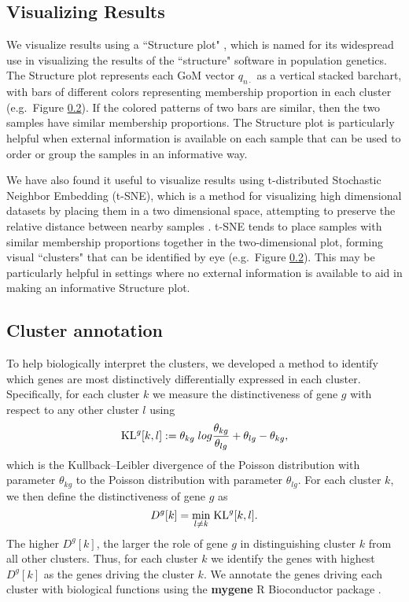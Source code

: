\subsection{Visualizing Results}

We visualize results using a ``Structure plot" \cite{Rosenberg2002}, 
which is named for its widespread use in visualizing the
results of the ``structure" software \cite{PritchardEtAl} in population genetics.
The Structure plot represents each GoM vector $q_{n\cdot}$
as  a vertical stacked barchart, with bars of different colors representing membership proportion in each cluster (e.g.~Figure \ref{}). If the colored patterns of two bars are similar, then the two samples have similar membership proportions.  The Structure plot is particularly helpful when external information is available on each sample that can be used to order or group the samples in an informative way.

We have also found it useful to visualize results using t-distributed Stochastic Neighbor Embedding (t-SNE), which is a method for visualizing high dimensional datasets by placing them in a two dimensional space, attempting to preserve the relative distance between nearby samples \cite{Maaten2014,Maaten2008}. t-SNE tends to place samples with similar membership proportions together in the two-dimensional plot, forming visual ``clusters" that can be identified by eye (e.g.~Figure \ref{}). This may be particularly helpful in settings where no external information is available to aid in making an informative Structure plot. 


\subsection{Cluster annotation}

To help biologically interpret the clusters, we developed a method to identify which genes are most distinctively differentially expressed in each cluster.  Specifically, for each cluster $k$ we measure the distinctiveness of gene $g$ with respect to any other cluster $l$ using
\begin{equation}
\text{KL}^{g} [k,l] : = \theta_{kg} \; log \frac{\theta_{kg}}{\theta_{lg}} + \theta_{lg} - \theta_{kg},
\end{equation}
which is the Kullback--Leibler divergence of the Poisson distribution with parameter $\theta_{kg}$ to the Poisson distribution with parameter $\theta_{lg}$. 
For each cluster $k$, we then define the distinctiveness of gene $g$ as 
\begin{equation}
D^{g}[k] = \underset{l \neq k}{\min} \; \text{KL}^{g} [k, l].
\end{equation}
The higher $D^g[k]$, the larger the role of gene $g$ in distinguishing cluster $k$ from all other clusters. 
Thus, for each cluster $k$ we identify the genes with highest $D^{g}[k]$ as the genes driving the cluster $k$. 
We annotate the genes driving each cluster with biological functions using the \textbf{mygene} R Bioconductor package  \cite{Thompson2014}.

